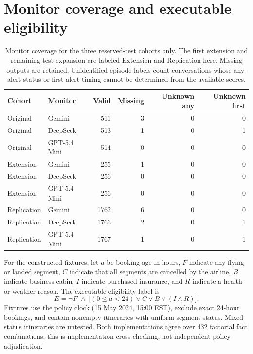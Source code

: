 \section{Monitor coverage and executable eligibility}
\begin{table}[h]\centering\small
\caption{Monitor coverage for the three reserved-test cohorts only. The first extension and remaining-test expansion are labeled Extension and Replication here. Missing outputs are retained. Unidentified episode labels count conversations whose any-alert status or first-alert timing cannot be determined from the available scores.}\label{tab:coverage}
\begin{tabular}{llrrrr}
\toprule
Cohort & Monitor & Valid & Missing & Unknown any & Unknown first\\
\midrule
Original & Gemini & 511 & 3 & 0 & 0\\
Original & DeepSeek & 513 & 1 & 0 & 1\\
Original & GPT-5.4 Mini & 514 & 0 & 0 & 0\\
Extension & Gemini & 255 & 1 & 0 & 0\\
Extension & DeepSeek & 256 & 0 & 0 & 0\\
Extension & GPT-5.4 Mini & 256 & 0 & 0 & 0\\
Replication & Gemini & 1762 & 6 & 0 & 0\\
Replication & DeepSeek & 1766 & 2 & 0 & 1\\
Replication & GPT-5.4 Mini & 1767 & 1 & 0 & 1\\
\bottomrule
\end{tabular}
\end{table}
For the constructed fixtures, let $a$ be booking age in hours, $F$ indicate any flying or landed segment, $C$ indicate that all segments are cancelled by the airline, $B$ indicate business cabin, $I$ indicate purchased insurance, and $R$ indicate a health or weather reason. The executable eligibility label is
\[ E=\neg F\;\land\;\bigl[(0\leq a<24)\lor C\lor B\lor(I\land R)\bigr]. \]
Fixtures use the policy clock (15 May 2024, 15:00 EST), exclude exact 24-hour bookings, and contain nonempty itineraries with uniform segment status. Mixed-status itineraries are untested. Both implementations agree over 432 factorial fact combinations; this is implementation cross-checking, not independent policy adjudication.
